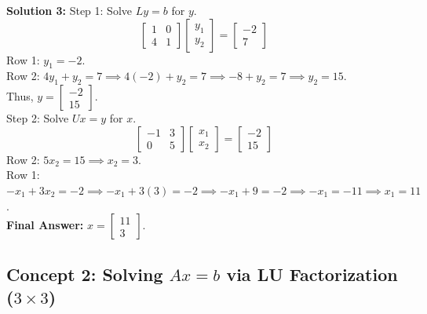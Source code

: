 \documentclass[11pt]{article}
\begin{document}
\vspace{0.5cm}
\textbf{Solution 3:}
Step 1: Solve $Ly = b$ for $y$.
$$ \begin{bmatrix} 1 & 0 \\ 4 & 1 \end{bmatrix} \begin{bmatrix} y_1 \\ y_2 \end{bmatrix} = \begin{bmatrix} -2 \\ 7 \end{bmatrix} $$
Row 1: $y_1 = -2$. \\
Row 2: $4y_1 + y_2 = 7 \implies 4(-2) + y_2 = 7 \implies -8 + y_2 = 7 \implies y_2 = 15$. \\
Thus, $y = \begin{bmatrix} -2 \\ 15 \end{bmatrix}$. \\
Step 2: Solve $Ux = y$ for $x$.
$$ \begin{bmatrix} -1 & 3 \\ 0 & 5 \end{bmatrix} \begin{bmatrix} x_1 \\ x_2 \end{bmatrix} = \begin{bmatrix} -2 \\ 15 \end{bmatrix} $$
Row 2: $5x_2 = 15 \implies x_2 = 3$. \\
Row 1: $-x_1 + 3x_2 = -2 \implies -x_1 + 3(3) = -2 \implies -x_1 + 9 = -2 \implies -x_1 = -11 \implies x_1 = 11$. \\
\textbf{Final Answer:} $x = \begin{bmatrix} 11 \\ 3 \end{bmatrix}$.

\subsection*{Concept 2: Solving $Ax = b$ via LU Factorization ($3 \times 3$)}
\end{document}

